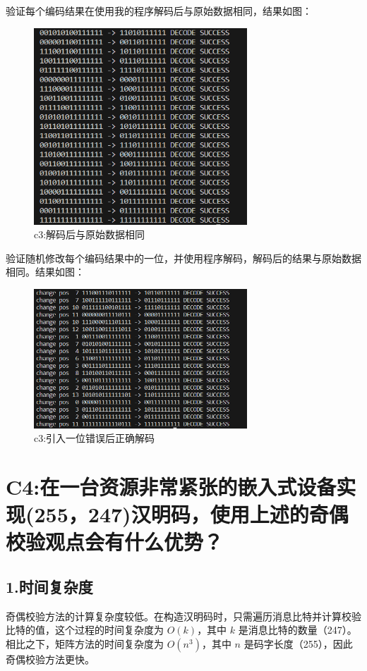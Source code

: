 \documentclass[12pt, a4paper]{ctexart}
\begin{document}
    验证每个编码结果在使用我的程序解码后与原始数据相同，结果如图：
    \begin{figure}[H]
        \centering
        \includegraphics[width=8cm]{./pic/2-2.png}		
        \caption{c3:解码后与原始数据相同}
    \end{figure}

    验证随机修改每个编码结果中的一位，并使用程序解码，解码后的结果与原始数据相同。结果如图：
    \begin{figure}[H]
        \centering
        \includegraphics[width=8cm]{./pic/2-3.png}		
        \caption{c3:引入一位错误后正确解码}
    \end{figure}


\section*{C4:在一台资源非常紧张的嵌入式设备实现(255，247)汉明码，使用上述的奇偶校验观点会有什么优势？}

\subsection*{1.时间复杂度}

奇偶校验方法的计算复杂度较低。在构造汉明码时，只需遍历消息比特并计算校验比特的值，这个过程的时间复杂度为 $O(k)$，其中 $k$ 是消息比特的数量（247）。相比之下，矩阵方法的时间复杂度为 $O(n^3)$，其中 $n$ 是码字长度（255），因此奇偶校验方法更快。
\end{document}
